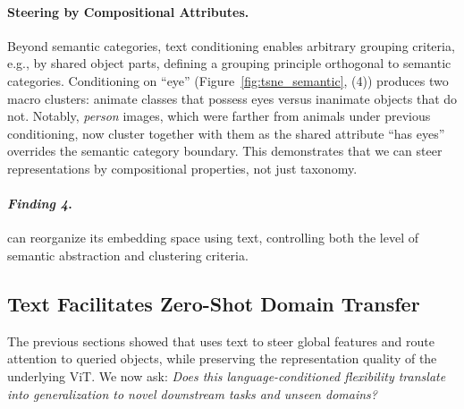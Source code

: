 \paragraph{Steering by Compositional Attributes.}
Beyond semantic categories, text conditioning enables arbitrary grouping criteria, e.g., by shared object parts, defining a grouping principle orthogonal to semantic categories.
Conditioning on ``eye'' (Figure~\ref{fig:tsne_semantic}, (4)) produces two macro clusters: animate classes that possess eyes versus inanimate objects that do not.
Notably, \textit{person} images, which were farther from animals under previous conditioning, now cluster together with them as the shared attribute ``has eyes'' overrides the semantic category boundary.
This demonstrates that we can steer representations by compositional properties, not just taxonomy.


\iffindingbox
\begin{tcolorbox}[colback=\findingcolor,
colframe=black, arc=4pt, boxsep=1pt]
\paragraph{\textbf{\textit{Finding 4}.}}
\model{} can reorganize its embedding space using text, controlling both the level of semantic abstraction and clustering criteria.
\end{tcolorbox}
\fi


\subsection{Text Facilitates Zero-Shot Domain Transfer}
\label{subsec:anomaly_detection}
% 

The previous sections showed that \model{} uses text to steer global features and route attention to queried objects, while preserving the representation quality of the underlying ViT. We now ask: \textit{Does this language-conditioned flexibility translate into generalization to novel downstream tasks and unseen domains?} 


